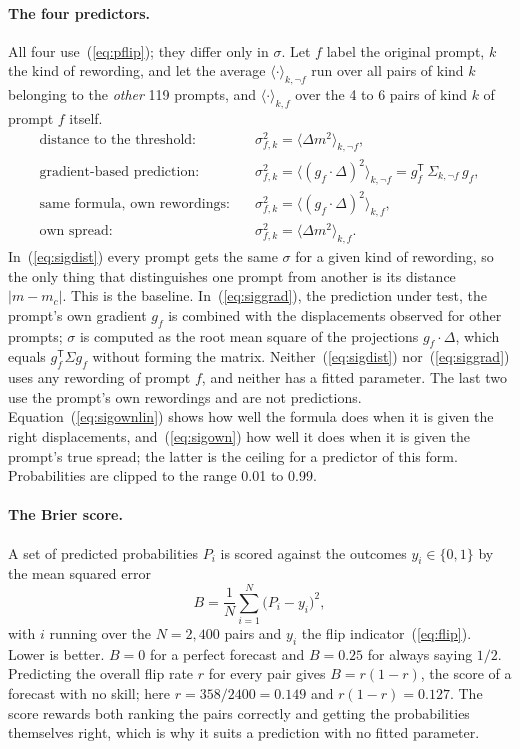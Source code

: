 \documentclass[11pt]{article}
\newcommand{\mc}{m_c}
\newcommand{\Dm}{\Delta m}
\begin{document}
\paragraph{The four predictors.} All four use~(\ref{eq:pflip}); they differ only in $\sigma$. Let $f$ label the original prompt, $k$ the kind of rewording, and let the average $\langle\cdot\rangle_{k,\neg f}$ run over all pairs of kind $k$ belonging to the \emph{other} 119 prompts, and $\langle\cdot\rangle_{k,f}$ over the 4 to 6 pairs of kind $k$ of prompt $f$ itself.
\begin{align}
\text{distance to the threshold:}\quad & \sigma^2_{f,k}=\bigl\langle \Dm^2\bigr\rangle_{k,\neg f}, \label{eq:sigdist}\\
\text{gradient-based prediction:}\quad & \sigma^2_{f,k}=\bigl\langle (g_f\cdot\Delta)^2\bigr\rangle_{k,\neg f}=g_f^{\mathsf T}\,\Sigma_{k,\neg f}\,g_f, \label{eq:siggrad}\\
\text{same formula, own rewordings:}\quad & \sigma^2_{f,k}=\bigl\langle (g_f\cdot\Delta)^2\bigr\rangle_{k,f}, \label{eq:sigownlin}\\
\text{own spread:}\quad & \sigma^2_{f,k}=\bigl\langle \Dm^2\bigr\rangle_{k,f}. \label{eq:sigown}
\end{align}
In~(\ref{eq:sigdist}) every prompt gets the same $\sigma$ for a given kind of rewording, so the only thing that distinguishes one prompt from another is its distance $|m-\mc|$. This is the baseline. In~(\ref{eq:siggrad}), the prediction under test, the prompt's own gradient $g_f$ is combined with the displacements observed for other prompts; $\sigma$ is computed as the root mean square of the projections $g_f\cdot\Delta$, which equals $g_f^{\mathsf T}\Sigma g_f$ without forming the matrix. Neither~(\ref{eq:sigdist}) nor~(\ref{eq:siggrad}) uses any rewording of prompt $f$, and neither has a fitted parameter. The last two use the prompt's own rewordings and are not predictions. Equation~(\ref{eq:sigownlin}) shows how well the formula does when it is given the right displacements, and~(\ref{eq:sigown}) how well it does when it is given the prompt's true spread; the latter is the ceiling for a predictor of this form. Probabilities are clipped to the range 0.01 to 0.99.

\paragraph{The Brier score.} A set of predicted probabilities $P_i$ is scored against the outcomes $y_i\in\{0,1\}$ by the mean squared error
\begin{equation}
B=\frac{1}{N}\sum_{i=1}^{N}\bigl(P_i-y_i\bigr)^2 ,
\label{eq:brier}
\end{equation}
with $i$ running over the $N=2{,}400$ pairs and $y_i$ the flip indicator~(\ref{eq:flip}). Lower is better. $B=0$ for a perfect forecast and $B=0.25$ for always saying $1/2$. Predicting the overall flip rate $r$ for every pair gives $B=r(1-r)$, the score of a forecast with no skill; here $r=358/2400=0.149$ and $r(1-r)=0.127$. The score rewards both ranking the pairs correctly and getting the probabilities themselves right, which is why it suits a prediction with no fitted parameter.
\end{document}
